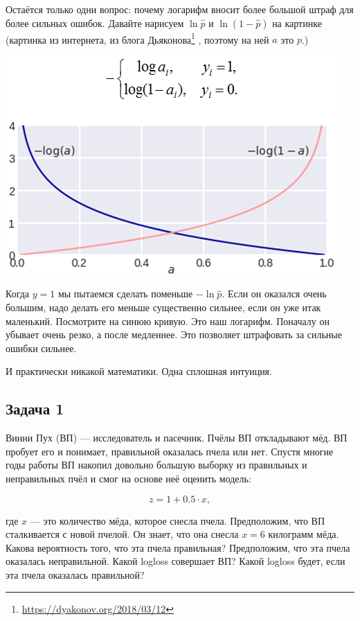 \documentclass[12pt, a4paper, oneside]{article}
\begin{document}
Остаётся только одни вопрос: почему логарифм вносит более большой штраф для более сильных ошибок.  Давайте нарисуем $\ln \hat p$ и $\ln (1 - \hat p)$ на картинке (картинка из интернета, из блога Дьяконова\footnote{{\color{blue} \url{https://dyakonov.org/2018/03/12}}} , поэтому на ней $a$ это $p$.) 


\begin{center}
	\includegraphics[scale=0.8]{log_loss_05.png}
\end{center}


Когда $y=1$ мы пытаемся сделать поменьше $- \ln \hat p$. Если он оказался очень большим, надо делать его меньше существенно сильнее, если он уже итак маленький. Посмотрите на синюю кривую. Это наш логарифм. Поначалу он убывает очень резко, а после медленнее. Это позволяет штрафовать за сильные ошибки сильнее. 

И практически никакой математики. Одна сплошная интуиция.



\subsection*{Задача 1}

Винни Пух (ВП) --- исследователь и пасечник. Пчёлы ВП откладывают мёд. ВП пробует его и понимает, правильной оказалась пчела или нет. Спустя многие годы работы ВП накопил довольно большую выборку из правильных и неправильных пчёл и смог на основе неё оценить модель: 

$$ 
z = 1 + 0.5 \cdot x,
$$

где $x$ --- это количество мёда, которое снесла пчела.  Предположим, что ВП сталкивается с новой пчелой. Он знает, что она снесла $x = 6$ килограмм мёда. Какова вероятность того, что эта пчела правильная? Предположим, что эта пчела оказалась неправильной. Какой logloss совершает ВП? Какой logloss будет, если эта пчела оказалась правильной? 
\end{document}
